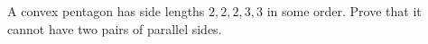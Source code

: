 A convex pentagon has side lengths $2,2,2,3,3$ in some order. Prove that it cannot have two pairs of parallel sides.
